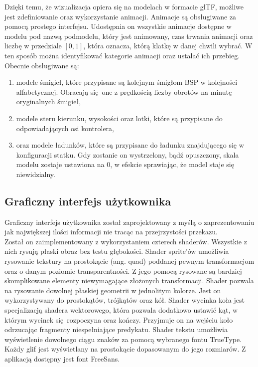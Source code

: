 Dzięki temu, że wizualizacja opiera się na modelach w formacie glTF, możliwe jest zdefiniowanie oraz wykorzystanie animacji. Animacje są obsługiwane za pomocą prostego interfejsu. Udostępnia on wszystkie animacje dostępne w modelu pod nazwą podmodelu, który jest animowany, czas trwania animacji oraz liczbę w przedziale $[0,1]$, która oznacza, którą klatkę w danej chwili wybrać. W ten sposób można identyfikować kategorie animacji oraz ustalać ich przebieg. Obecnie obsługiwane są:
\begin{enumerate}
	\item modele śmigieł, które przypisane są kolejnym śmigłom BSP w kolejności alfabetycznej. Obracają się one z prędkością liczby obrotów na minutę oryginalnych śmigieł,
	\item modele steru kierunku, wysokości oraz lotki, które są przypisane do odpowiadających osi kontrolera,
	\item oraz modele ładunków, które są przypisane do ładunku znajdującego się w konfiguracji statku. Gdy zostanie on wystrzelony, bądź opuszczony, skala modelu zostaje ustawiona na $0$, w efekcie sprawiając, że model staje się niewidzialny.
\end{enumerate}

\subsection{Graficzny interfejs użytkownika}

Graficzny interfejs użytkownika został zaprojektowany z myślą o zaprezentowaniu jak największej ilości informacji nie tracąc na przejrzystości przekazu.
\\

Został on zaimplementowany z wykorzystaniem czterech shaderów. Wszystkie z nich rysują płaski obraz bez testu głębokości. Shader sprite'ów umożliwia rysowanie tekstury na prostokącie (ang. quad) poddanej pewnym transformacjom oraz o danym poziomie transparentności. Z jego pomocą rysowane są bardziej skomplikowane elementy niewymagające złożonych transformacji. Shader pozwala na rysowanie dowolnej płaskiej geometrii w jednolitym kolorze. Jest on wykorzystywany do prostokątów, trójkątów oraz kół. Shader wycinka koła jest specjalizacją shadera wektorowego, która pozwala dodatkowo ustawić kąt, w którym wycinek się rozpoczyna oraz kończy. Przyjmuje on na wejściu koło odrzucając fragmenty niespełniające predykatu. Shader tekstu umożliwia wyświetlenie dowolnego ciągu znaków za pomocą wybranego fontu TrueType. Każdy glif jest wyświetlany na prostokącie dopasowanym do jego rozmiarów. Z aplikacją dostępny jest font FreeSans.

